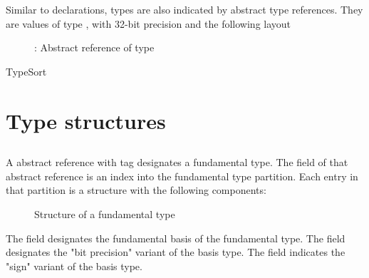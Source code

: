 \label{sec:ifc-types}

Similar to declarations, types are also indicated by abstract type references.
They are values of type , with 32-bit precision and the
following layout
\begin{figure}[H]
  \centering
  \caption{: Abstract reference of type}
  \label{fig:ifc-type-index}
\end{figure}

\begin{SortEnum}{TypeSort}
\end{SortEnum}


\section{Type structures}
\label{sec:ifc-type-structures}

\subsection{}
\label{sec:ifc:TypeSort:VendorExtension}


\subsection{}
\label{sec:ifc:TypeSort:Fundamental}

A  abstract reference with tag  designates a fundamental type.
The  field of that abstract reference is an index into the fundamental type partition.
Each entry in that partition is a structure with the following components:
%
\begin{figure}[H]
	\centering
	\caption{Structure of a fundamental type}
	\label{fig:ifc-fundamental-type-structure}
\end{figure}
%
The  field designates the fundamental basis of the fundamental type.
The  field designates the "bit precision" variant of the basis type.
The  field indicates the "sign" variant of the basis type.

